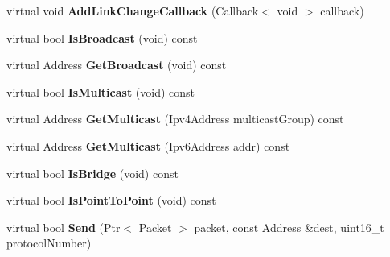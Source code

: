 \begin{DoxyCompactItemize}
\item 
\hypertarget{classns3_1_1PLC__NetDevice_aff8a63309668ab0508e99a9ad7012fbb}{virtual void {\bfseries \-Add\-Link\-Change\-Callback} (\-Callback$<$ void $>$ callback)}\label{classns3_1_1PLC__NetDevice_aff8a63309668ab0508e99a9ad7012fbb}

\item 
\hypertarget{classns3_1_1PLC__NetDevice_a06c8ec6f9d9d0f6c503514078f0ac61a}{virtual bool {\bfseries \-Is\-Broadcast} (void) const }\label{classns3_1_1PLC__NetDevice_a06c8ec6f9d9d0f6c503514078f0ac61a}

\item 
\hypertarget{classns3_1_1PLC__NetDevice_aa3ae0ba784393f8924a96b43e6558559}{virtual \-Address {\bfseries \-Get\-Broadcast} (void) const }\label{classns3_1_1PLC__NetDevice_aa3ae0ba784393f8924a96b43e6558559}

\item 
\hypertarget{classns3_1_1PLC__NetDevice_a614cd80d1af3ca9d3e7634280e38ca60}{virtual bool {\bfseries \-Is\-Multicast} (void) const }\label{classns3_1_1PLC__NetDevice_a614cd80d1af3ca9d3e7634280e38ca60}

\item 
\hypertarget{classns3_1_1PLC__NetDevice_a3276897389472e732ab03102a61403ea}{virtual \-Address {\bfseries \-Get\-Multicast} (\-Ipv4\-Address multicast\-Group) const }\label{classns3_1_1PLC__NetDevice_a3276897389472e732ab03102a61403ea}

\item 
\hypertarget{classns3_1_1PLC__NetDevice_a1e6e26b5ee55820281a9b892276b8c16}{virtual \-Address {\bfseries \-Get\-Multicast} (\-Ipv6\-Address addr) const }\label{classns3_1_1PLC__NetDevice_a1e6e26b5ee55820281a9b892276b8c16}

\item 
\hypertarget{classns3_1_1PLC__NetDevice_ab1b87e5250404f28f5df008f82a32bdc}{virtual bool {\bfseries \-Is\-Bridge} (void) const }\label{classns3_1_1PLC__NetDevice_ab1b87e5250404f28f5df008f82a32bdc}

\item 
\hypertarget{classns3_1_1PLC__NetDevice_aa9d9f48b0a94478a9dfbe2039bf5a29a}{virtual bool {\bfseries \-Is\-Point\-To\-Point} (void) const }\label{classns3_1_1PLC__NetDevice_aa9d9f48b0a94478a9dfbe2039bf5a29a}

\item 
\hypertarget{classns3_1_1PLC__NetDevice_a35e51170ecbddce0c6cc9382047affa2}{virtual bool {\bfseries \-Send} (\-Ptr$<$ \-Packet $>$ packet, const \-Address \&dest, uint16\-\_\-t protocol\-Number)}\label{classns3_1_1PLC__NetDevice_a35e51170ecbddce0c6cc9382047affa2}


\end{DoxyCompactItemize}
